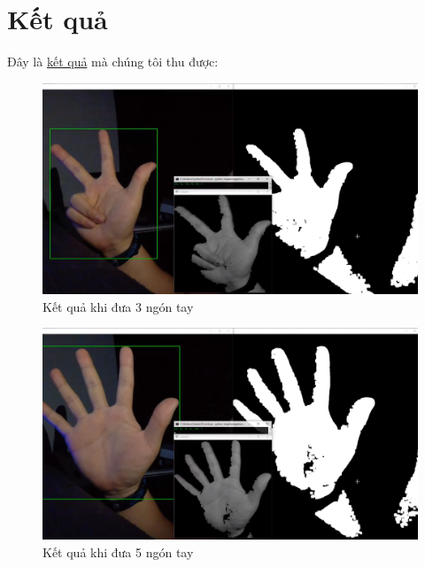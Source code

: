 \documentclass[a4paper, 12pt]{article}
\begin{document}
\section{Kết quả}
Đây là \href{https://www.youtube.com/watch?v=jdHNLqCSJrM&feature=youtu.be}{kết quả} mà chúng tôi thu được:
\begin{figure}[!ht]
\includegraphics[width=\textwidth]{result_1.png}
\caption{Kết quả khi đưa 3 ngón tay}
\label{fig:foo}
\end{figure}

\begin{figure}[!ht]
\includegraphics[width=\textwidth]{result_2.png}
\caption{Kết quả khi đưa 5 ngón tay}
\label{fig:foo}
\end{figure}
\end{document}
